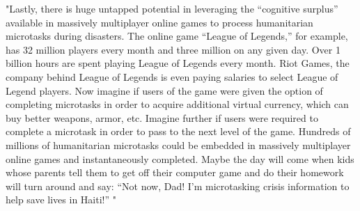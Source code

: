 \citep{Meier2013} "Lastly, there is huge untapped potential in leveraging the “cognitive surplus” available in massively multiplayer online games to process humanitarian microtasks during disasters. The online game “League of Legends,” for example, has 32 million players every month and three million on any given day. Over 1 billion hours are spent playing League of Legends every month. Riot Games, the company behind League of Legends is even paying salaries to select League of Legend players. Now imagine if users of the game were given the option of completing microtasks in order to acquire additional virtual currency, which can buy better weapons, armor, etc. Imagine further if users were required to complete a microtask in order to pass to the next level of the game. Hundreds of millions of humanitarian microtasks could be embedded in massively multiplayer online games and instantaneously completed. Maybe the day will come when kids whose parents tell them to get off their computer game and do their homework will turn around and say: “Not now, Dad! I’m microtasking crisis information to help save lives in Haiti!” "